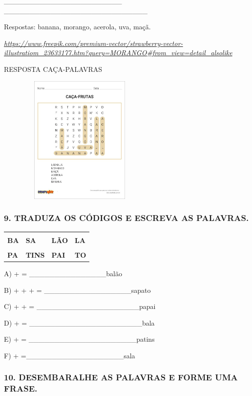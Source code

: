 \_\_\_\_\_\_\_\_\_\_\_\_\_\_\_\_\_\_\_\_\_\_\_
\_\_\_\_\_\_\_\_\_\_\_\_\_\_\_\_\_\_\_\_\_\_\_\_\_\_\_\_

Respostas: banana, morango, acerola, uva, maçã.

\href{https://www.freepik.com/premium-vector/strawberry-vector-illustratiom_23633177.htm?query=MORANGO\#from_view=detail_alsolike}{\emph{https://www.freepik.com/premium-vector/strawberry-vector-illustratiom\_23633177.htm?query=MORANGO\#from\_view=detail\_alsolike}}

RESPOSTA CAÇA-PALAVRAS

\includegraphics[width=3.23199in,height=2.51443in]{media/image104.jpg}

\subsubsection{9. TRADUZA OS CÓDIGOS E ESCREVA AS
PALAVRAS.}\label{traduza-os-cuxf3digos-e-escreva-palavras.}

\begin{longtable}[]{@{}llll@{}}
\toprule
& & &\tabularnewline
\textbf{BA} & \textbf{SA} & \textbf{LÃO} & \textbf{LA}\tabularnewline
& & &\tabularnewline
\textbf{PA} & \textbf{TINS} & \textbf{PAI} & \textbf{TO}\tabularnewline
\bottomrule
\end{longtable}

A) + = \_\_\_\_\_\_\_\_\_\_\_\_\_\_\_balão

B) + + + = \_\_\_\_\_\_\_\_\_\_\_\_\_\_\_\_\_sapato

C) + + = \_\_\_\_\_\_\_\_\_\_\_\_\_\_\_\_\_\_\_\_papai

D) + = \_\_\_\_\_\_\_\_\_\_\_\_\_\_\_\_\_\_\_\_\_\_bala

E) + = \_\_\_\_\_\_\_\_\_\_\_\_\_\_\_\_\_\_\_\_\_patins

F) + =\_\_\_\_\_\_\_\_\_\_\_\_\_\_\_\_\_\_\_sala

\subsubsection{10. DESEMBARALHE AS PALAVRAS E FORME UMA
FRASE.}\label{desembaralhe-as-palavras-e-forme-uma-frase.}

